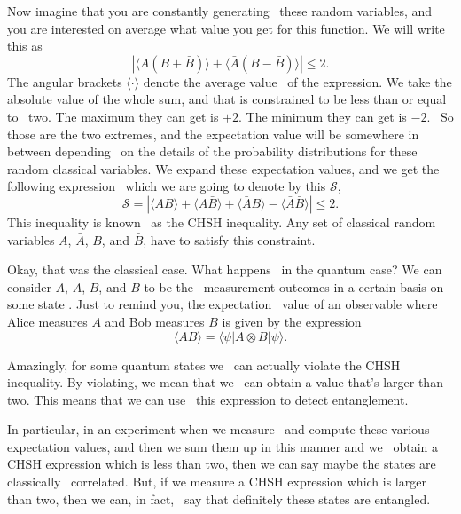 Now imagine that you are constantly generating 
these random variables, and you are
interested on average what value you get for this function.
We will write this as
\begin{equation}
|\langle A(B+\bar{B})\rangle+\langle\bar{A}(B-\bar{B})\rangle| \leq 2.
\end{equation}
The angular brackets $\langle\cdot\rangle$ denote the average value 
of the expression. We take the absolute value of the whole sum,
and that is constrained to be less than or equal to 
two. The maximum they can
get is $+2$. The minimum they can get is $-2$. 
So those are the two extremes, and the expectation
value will be somewhere in between depending 
on the details of the probability distributions
for these random classical variables. We expand these expectation values,
and we get the following expression 
which we are going to denote by this $\mathcal{S}$,
\begin{equation}
\mathcal{S}=|\langle A B\rangle+\langle A \bar{B}\rangle+\langle\bar{A} B\rangle-\langle\bar{A} \bar{B}\rangle| \leq 2.
\label{eq:chsh-inequality}
\end{equation}
This inequality is known 
as the CHSH inequality.
Any set of classical random variables $A$,
$\bar{A}$, $B$, and $\bar{B}$, have to satisfy this constraint.

Okay, that was the classical case. What happens 
in the quantum case? We can consider $A$,
$\bar{A}$, $B$, and $\bar{B}$ to be the 
measurement outcomes in a certain basis on some
state \ket{\psi}. Just to remind you, the expectation 
value of an observable where Alice measures $A$ and
Bob measures $B$ is given by the expression
\begin{equation}
\langle A B\rangle=\langle\psi|A \otimes B| \psi\rangle.
\end{equation}

Amazingly, for some quantum states we 
can actually violate the CHSH inequality.
By violating, we mean that we 
can obtain a value that's larger than two.
This means that we can use 
this expression to detect entanglement.

In particular, in an experiment when we measure 
and compute these various expectation values,
and then we sum them up in this manner and we 
obtain a CHSH expression which is less than two,
then we can say maybe the states are classically 
correlated. But, if we measure a CHSH expression
which is larger than two, then we can, in fact, 
say that definitely these states are entangled.

